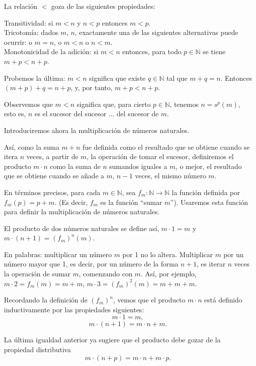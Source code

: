 \documentclass[12pt,oneside]{book}
\begin{document}
La relación \(<\) goza de las siguientes propiedades:

Transitividad: si \(m < n\) y \(n < p\) entonces \(m < p\).\\
Tricotomía: dados \(m\), \(n\), exactamente una de las siguientes alternativas puede ocurrir: o \(m = n\), o \(m < n\) o \(n < m\).\\
Monotonicidad de la adición: si \(m < n\) entonces, para todo \(p \in \mathbb{N}\) se tiene \(m + p < n + p\).

Probemos la última: \(m < n\) significa que existe \(q \in \mathbb{N}\) tal que \(m + q = n\). Entonces \((m + p) + q = n + p\), y, por tanto, \(m + p < n + p\).

Observemos que \(m < n\) significa que, para cierto \(p \in \mathbb{N}\), tenemos \(n = s^p(m)\), esto es, \(n\) es el sucesor del sucesor ... del sucesor de \(m\).

Introduciremos ahora la multiplicación de números naturales.

Así, como la suma \(m + n\) fue definida como el resultado que se obtiene cuando se itera \(n\) veces, a partir de \(m\), la operación de tomar el sucesor, definiremos el producto \(m \cdot n\) como la suma de \(n\) sumandos iguales a \(m\), o mejor, el resultado que se obtiene cuando se añade a \(m\), \(n - 1\) veces, el mismo número \(m\).

En términos precisos, para cada \(m \in \mathbb{N}\), sea \(f_m: \mathbb{N} \to \mathbb{N}\) la función definida por \(f_m(p) = p + m\). (Es decir, \(f_m\) es la función “sumar \(m\)”). Usaremos esta función para definir la multiplicación de números naturales.

El producto de dos números naturales se define así, \(m \cdot 1 = m\) y \(m \cdot (n + 1) = (f_m)^n(m)\).

En palabras: multiplicar un número \(m\) por 1 no lo altera. Multiplicar \(m\) por un número mayor que 1, es decir, por un número de la forma \(n+1\), es iterar \(n\) veces la operación de sumar \(m\), comenzando con \(m\). Así, por ejemplo, \(m \cdot 2 = f_m(m) = m+m\), \(m \cdot 3 = (f_m)^2(m) = m + m + m\).

Recordando la definición de \((f_m)^n\), vemos que el producto \(m \cdot n\) está definido inductivamente por las propiedades siguientes:
\[
m \cdot 1 = m,
\]
\[
m \cdot (n + 1) = m \cdot n + m.
\]

La última igualdad anterior ya sugiere que el producto debe gozar de la propiedad distributiva
\[
m \cdot (n + p) = m \cdot n + m \cdot p.
\]
\end{document}
